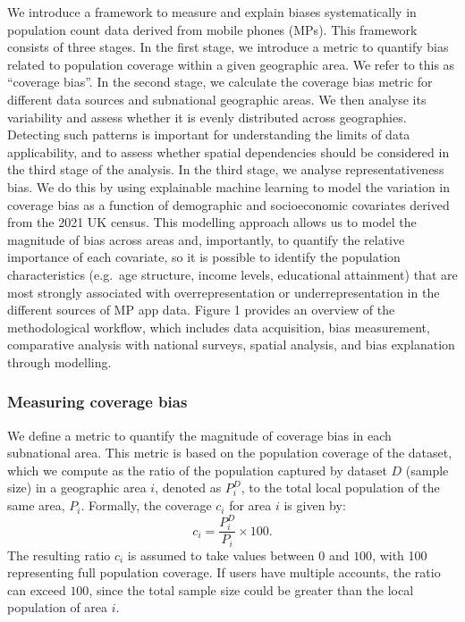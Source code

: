 \documentclass[]{rsos}%
\begin{document}
We introduce a framework to measure and explain biases systematically in
population count data derived from mobile phones (MPs). This framework
consists of three stages. In the first stage, we introduce a metric to
quantify bias related to population coverage within a given geographic
area. We refer to this as ``coverage bias''. In the second stage, we
calculate the coverage bias metric for different data sources and
subnational geographic areas. We then analyse its variability and assess
whether it is evenly distributed across geographies. Detecting such
patterns is important for understanding the limits of data
applicability, and to assess whether spatial dependencies should be
considered in the third stage of the analysis. In the third stage, we
analyse representativeness bias. We do this by using explainable machine
learning to model the variation in coverage bias as a function of
demographic and socioeconomic covariates derived from the 2021 UK
census. This modelling approach allows us to model the magnitude of bias
across areas and, importantly, to quantify the relative importance of
each covariate, so it is possible to identify the population
characteristics (e.g.~age structure, income levels, educational
attainment) that are most strongly associated with overrepresentation or
underrepresentation in the different sources of MP app data. Figure 1
provides an overview of the methodological workflow, which includes data
acquisition, bias measurement, comparative analysis with national
surveys, spatial analysis, and bias explanation through modelling.

\subsubsection{Measuring coverage bias}\label{measuring-coverage-bias}

We define a metric to quantify the magnitude of coverage bias in each
subnational area. This metric is based on the population coverage of the
dataset, which we compute as the ratio of the population captured by
dataset \(D\) (sample size) in a geographic area \(i\), denoted as \(P_i^D\),
to the total local population of the same area, \(P_i\). Formally, the
coverage \(c_i\) for area \(i\) is given by: \begin{equation}
c_i = \dfrac{P_i^D}{P_i} \times 100.
\end{equation} The resulting ratio \(c_i\) is assumed to take values
between \(0\) and \(100\), with 100 representing full population coverage.
If users have multiple accounts, the ratio can exceed \(100\), since the
total sample size could be greater than the local population of area
\(i\).
\end{document}
